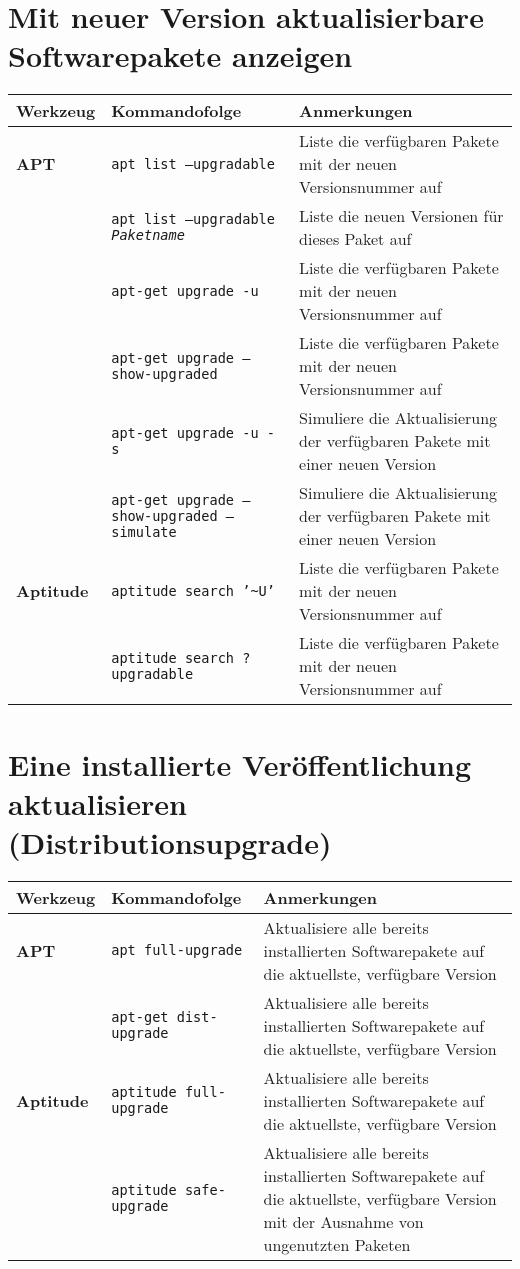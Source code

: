 \documentclass[10pt]{article}
\begin{document}
\section{Mit neuer Version aktualisierbare Softwarepakete anzeigen}
\begin{tabular}{ p{3.5cm} p{9cm} p{11cm}}
  \hline
  \rowcolor{Gray}
  \textbf{Werkzeug} & \textbf{Kommandofolge} & \textbf{Anmerkungen} \\
  \hline 
  \textbf{APT} & \texttt{apt list --upgradable} & Liste die verfügbaren Pakete mit der neuen Versionsnummer auf\\
  \rowcolor{Gray}
  & \texttt{apt list --upgradable \textit{Paketname}} & Liste die neuen Versionen für dieses Paket auf\\
  & \texttt{apt-get upgrade -u} & Liste die verfügbaren Pakete mit der neuen Versionsnummer auf \\
  \rowcolor{Gray}
  & \texttt{apt-get upgrade --show-upgraded} & Liste die verfügbaren Pakete mit der neuen Versionsnummer auf \\
  & \texttt{apt-get upgrade -u -s} & Simuliere die Aktualisierung der verfügbaren Pakete mit einer neuen Version \\
  \rowcolor{Gray}
  & \texttt{apt-get upgrade --show-upgraded --simulate} & Simuliere die Aktualisierung der verfügbaren Pakete mit einer neuen Version \\
  \textbf{Aptitude} & \texttt{aptitude search '\textasciitilde{U}'} & Liste die verfügbaren Pakete mit der neuen Versionsnummer auf \\
  \rowcolor{Gray}
  & \texttt{aptitude search ?upgradable} &  Liste die verfügbaren Pakete mit der neuen Versionsnummer auf \\
  \hline
\end{tabular}

\section{Eine installierte Veröffentlichung aktualisieren (Distributionsupgrade)}
\begin{tabular}{ p{3.5cm} p{9cm} p{11cm}}
  \hline
  \rowcolor{Gray}
  \textbf{Werkzeug} & \textbf{Kommandofolge} & \textbf{Anmerkungen} \\
  \hline 
  \textbf{APT} & \texttt{apt full-upgrade} & Aktualisiere alle bereits installierten Softwarepakete auf die aktuellste, verfügbare Version \\
  \rowcolor{Gray}
  & \texttt{apt-get dist-upgrade} & Aktualisiere alle bereits installierten Softwarepakete auf die aktuellste, verfügbare Version \\
  \textbf{Aptitude} & \texttt{aptitude full-upgrade} & Aktualisiere alle bereits installierten Softwarepakete auf die aktuellste, verfügbare Version \\
  \rowcolor{Gray}
  & \texttt{aptitude safe-upgrade} &  Aktualisiere alle bereits installierten Softwarepakete auf die aktuellste, verfügbare Version mit der Ausnahme von ungenutzten Paketen \\
  \hline
\end{tabular}
\end{document}
